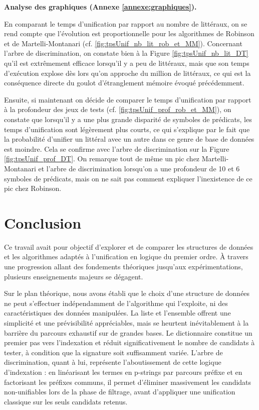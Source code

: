 \documentclass[11pt]{article}
\newenvironment{paraph}[1]{%
  \medskip
  \noindent\textbf{#1.}\quad

  \vspace{0.2cm}
}{%
  \medskip
}
\begin{document}
\begin{paraph}{Analyse des graphiques (Annexe \ref{annexe:graphiques})}
    En comparant le temps d'unification par rapport au nombre de littéraux, on se rend compte que l'évolution est proportionnelle pour les algorithmes de Robinson et de Martelli-Montanari (cf. \ref{fig:tpsUnif_nb_lit_rob_et_MM}). Concernant l'arbre de discrimination, on constate bien à la Figure \ref{fig:tpsUnif_nb_lit_DT} qu'il est extrêmement efficace lorsqu'il y a peu de littéraux, mais que son temps d'exécution explose dès lors qu'on approche du million de littéraux, ce qui est la conséquence directe du goulot d'étranglement mémoire évoqué précédemment.
    
    Ensuite, si maintenant on décide de comparer le temps d'unification par rapport à la profondeur des jeux de tests (cf. \ref{fig:tpsUnif_prof_rob_et_MM}), on constate que lorsqu'il y a une plus grande disparité de symboles de prédicats, les temps d'unification sont légèrement plus courts, ce qui s'explique par le fait que la probabilité d'unifier un littéral avec un autre dans ce genre de base de données est moindre. Cela se confirme avec l'arbre de discrimination sur la Figure \ref{fig:tpsUnif_prof_DT}.
    On remarque tout de même un pic chez Martelli-Montanari et l'arbre de discrimination lorsqu'on a une profondeur de 10 et 6 symboles de prédicats, mais on ne sait pas comment expliquer l'inexistence de ce pic chez Robinson.
\end{paraph}



\newpage

\section*{Conclusion}
    Ce travail avait pour objectif d'explorer et de comparer les structures de données et les algorithmes adaptés à l'unification en logique du premier ordre. À travers une progression allant des fondements théoriques jusqu'aux expérimentations, plusieurs enseignements majeurs se dégagent.

    \vspace{0.3cm}
    Sur le plan théorique, nous avons établi que le choix d'une structure de données ne peut s'effectuer indépendamment de l'algorithme qui l'exploite, ni des caractéristiques des données manipulées. La liste et l'ensemble offrent une simplicité et une prévisibilité appréciables, mais se heurtent inévitablement à la barrière du parcours exhaustif sur de grandes bases. Le dictionnaire constitue un premier pas vers l'indexation et réduit significativement le nombre de candidats à tester, à condition que la signature soit suffisamment variée. L'arbre de discrimination, quant à lui, représente l'aboutissement de cette logique d'indexation : en linéarisant les termes en p-strings par parcours préfixe et en factorisant les préfixes communs, il permet d'éliminer massivement les candidats non-unifiables lors de la phase de filtrage, avant d'appliquer une unification classique sur les seuls candidats retenus.
\end{document}
